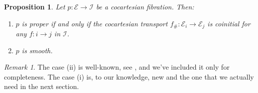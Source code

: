 \documentclass[a4paper,reqno,10pt]{amsart}
\newtheorem{proposition}[theorem]{Proposition}
\theoremstyle{definition}
\theoremstyle{remark}
\newtheorem{remark}[theorem]{Remark}
\newcommand{\E}{\mathcal{E}}
\newcommand{\I}{\mathcal{I}}
\begin{document}
\begin{proposition}\label{CocartesianProper}
Let $p\colon\E\rightarrow\I$ be a cocartesian fibration. Then:
\begin{enumerate}[label=(\roman*)]
\item $p$ is proper if and only if the cocartesian transport $f_{\#}\colon\E_i\rightarrow\E_j$ is coinitial for any $f\colon i\rightarrow j$ in $\I$.
\item $p$ is smooth.
\end{enumerate}
\end{proposition}
\begin{remark}
The case (ii) is well-known, see \cite[Proposition 4.1.2.15]{HTT}, and we've included it only for completeness. The case (i) is, to our knowledge, new and the one that we actually need in the next section.
\end{remark}
\end{document}
